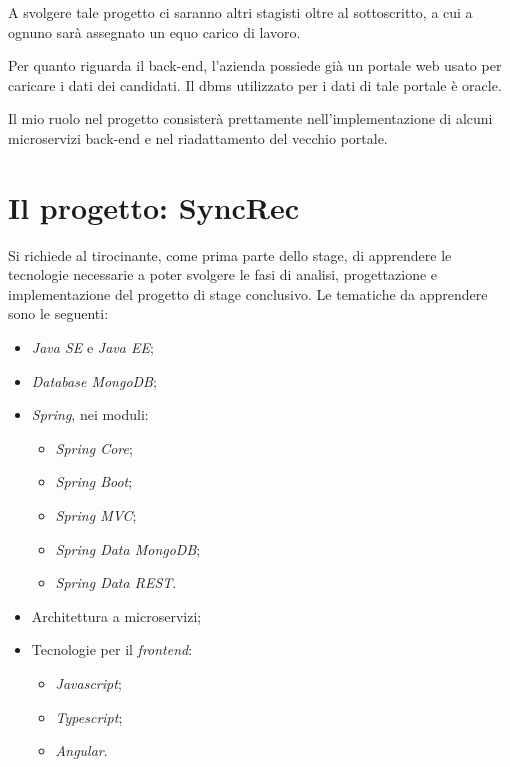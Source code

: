 A svolgere tale progetto ci saranno altri stagisti oltre al sottoscritto, a cui a ognuno sarà assegnato un equo carico di lavoro.

Per quanto riguarda il back-end, l'azienda possiede già un portale web usato per caricare i dati dei candidati. Il \gls{dbms} utilizzato per i dati di tale portale è \gls{oracle}.

Il mio ruolo nel progetto consisterà prettamente nell'implementazione di alcuni microservizi back-end e nel riadattamento del vecchio portale.


\section{Il progetto: SyncRec}

Si richiede al tirocinante, come prima parte dello stage, di apprendere le tecnologie necessarie a poter svolgere le fasi di analisi, progettazione e implementazione del progetto di stage conclusivo.
Le tematiche da apprendere sono le seguenti:
\begin{itemize}
	\item \textit{Java SE} e \textit{Java EE};
	\item \textit{Database MongoDB};
	\item \textit{Spring}, nei moduli:
	\begin{itemize}[noitemsep]
		\item \textit{Spring Core};
		\item \textit{Spring Boot};
		\item \textit{Spring MVC};
		\item \textit{Spring Data MongoDB};
		\item \textit{Spring Data REST}.
	\end{itemize}
	\item Architettura a microservizi;
	\item Tecnologie per il \textit{frontend}:
	\begin{itemize}[noitemsep]
		\item \textit{Javascript};
		\item \textit{Typescript};
		\item \textit{Angular}.
	\end{itemize}
\end{itemize}

